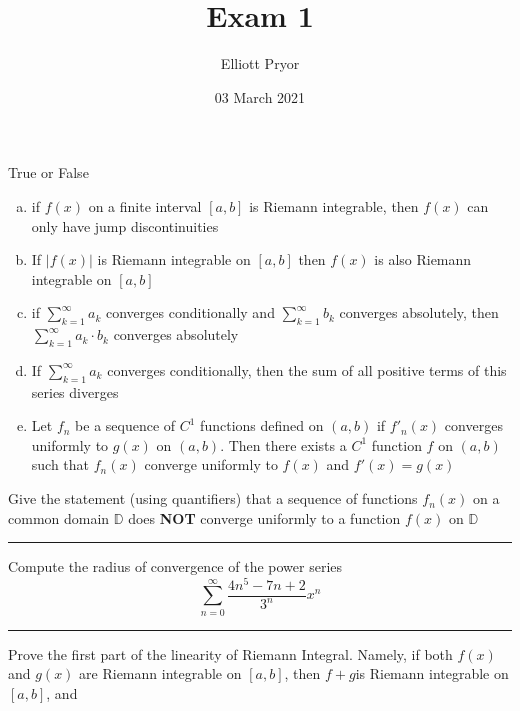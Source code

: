 \documentclass[11pt]{article}
\title{Exam 1}
\author{Elliott Pryor}
\date{03 March 2021}
\begin{document}
\maketitle


True or False

\begin{enumerate}[(a)]
    \item if $f(x)$ on a finite interval $[a,b]$ is Riemann integrable, 
    then $f(x)$ can only have jump discontinuities
    
    \item If $|f(x)|$ is Riemann integrable on $[a,b]$ 
    then $f(x)$ is also Riemann integrable on $[a,b]$

    \item if $\sum_{k = 1} ^ \infty a_k$ converges conditionally and 
    $\sum_{k = 1} ^ \infty b_k$ converges absolutely, 
    then $\sum_{k = 1} ^ \infty a_k \cdot b_k$ converges absolutely

    \item If $\sum_{k = 1} ^ \infty a_k$ converges conditionally, 
    then the sum of all positive terms of this series diverges

    \item Let $f_n$ be a sequence of $C^1$ functions defined on $(a,b)$
    if $f'_n (x)$ converges uniformly to $g(x)$ on $(a,b)$. 
    Then there exists a $C^1$ function $f$ on $(a,b)$ such that $f_n(x)$ converge uniformly to $f(x)$
    and $f'(x) = g(x)$
\end{enumerate}



Give the statement (using quantifiers) that a sequence of functions $f_n(x)$ 
on a common domain $\mathbb{D}$ does \textbf{NOT} converge uniformly to a function
$f(x)$ on $\mathbb{D}$

\hrule









Compute the radius of convergence of the power series 
$$\sum_{n=0} ^ \infty \frac{4n^5 - 7n + 2}{3^n} x^n$$

\hrule







Prove the first part of the linearity of Riemann Integral. 
Namely, if both $f(x)$ and $g(x)$ are Riemann integrable on $[a,b]$, 
then $f+g$is Riemann integrable on $[a,b]$, and 
\end{document}
